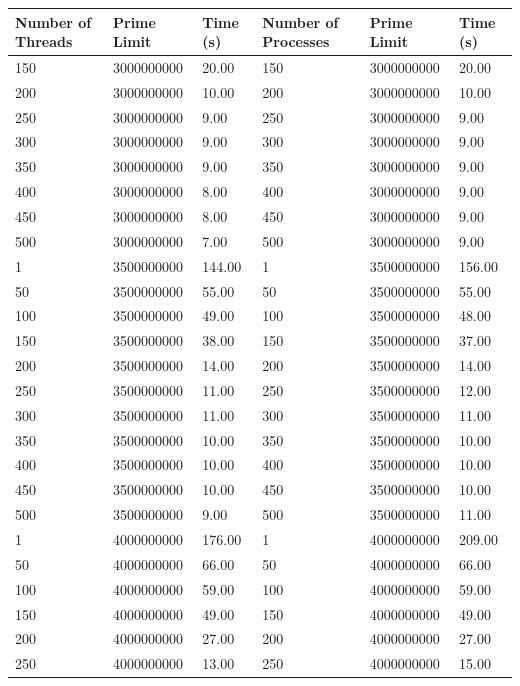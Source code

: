 \documentclass[letterpaper,10pt,titlepage]{article}
\begin{document}
\begin{enumerate}
\begin{tabular}{| l | l | l | l | l | l |}
\hline Number of Threads & Prime Limit & Time (s) & Number of Processes & Prime Limit & Time (s) \\ 
\hline 150 & 3000000000 & 20.00 & 150 & 3000000000 & 20.00 \\
\hline 200 & 3000000000 & 10.00 & 200 & 3000000000 & 10.00 \\
\hline 250 & 3000000000 & 9.00 & 250 & 3000000000 & 9.00 \\
\hline 300 & 3000000000 & 9.00 & 300 & 3000000000 & 9.00 \\
\hline 350 & 3000000000 & 9.00 & 350 & 3000000000 & 9.00 \\
\hline 400 & 3000000000 & 8.00 & 400 & 3000000000 & 9.00 \\
\hline 450 & 3000000000 & 8.00 & 450 & 3000000000 & 9.00 \\
\hline 500 & 3000000000 & 7.00 & 500 & 3000000000 & 9.00 \\
\hline 1 & 3500000000 & 144.00 & 1 & 3500000000 & 156.00 \\
\hline 50 & 3500000000 & 55.00 & 50 & 3500000000 & 55.00 \\
\hline 100 & 3500000000 & 49.00 & 100 & 3500000000 & 48.00 \\
\hline 150 & 3500000000 & 38.00 & 150 & 3500000000 & 37.00 \\
\hline 200 & 3500000000 & 14.00 & 200 & 3500000000 & 14.00 \\
\hline 250 & 3500000000 & 11.00 & 250 & 3500000000 & 12.00 \\
\hline 300 & 3500000000 & 11.00 & 300 & 3500000000 & 11.00 \\
\hline 350 & 3500000000 & 10.00 & 350 & 3500000000 & 10.00 \\
\hline 400 & 3500000000 & 10.00 & 400 & 3500000000 & 10.00 \\
\hline 450 & 3500000000 & 10.00 & 450 & 3500000000 & 10.00 \\
\hline 500 & 3500000000 & 9.00 & 500 & 3500000000 & 11.00 \\
\hline 1 & 4000000000 & 176.00 & 1 & 4000000000 & 209.00 \\
\hline 50 & 4000000000 & 66.00 & 50 & 4000000000 & 66.00 \\
\hline 100 & 4000000000 & 59.00 & 100 & 4000000000 & 59.00 \\
\hline 150 & 4000000000 & 49.00 & 150 & 4000000000 & 49.00 \\
\hline 200 & 4000000000 & 27.00 & 200 & 4000000000 & 27.00 \\
\hline 250 & 4000000000 & 13.00 & 250 & 4000000000 & 15.00 \\

\end{tabular}
\end{enumerate}
\end{document}
